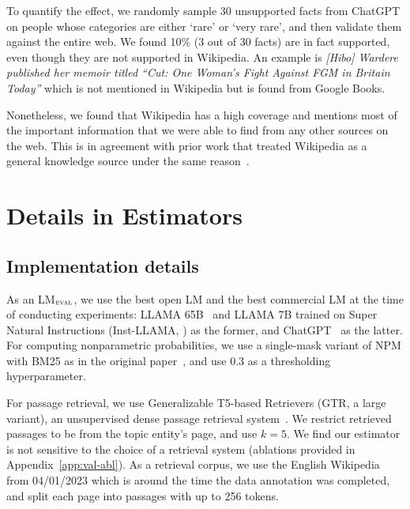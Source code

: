 \documentclass[11pt]{article}
\newcommand{\evalLM}{LM$_\textsc{eval}$}
\newcommand{\kalpesh}[1]{\textcolor{brown}{[Kalpesh: #1]}
}
\newcommand{\hanna}[1]{\textcolor{red}{[Hanna: #1]}
}
\begin{document}
To quantify the effect, we randomly sample 30 unsupported facts from ChatGPT on people whose categories are either `rare' or `very rare', and then validate them against the entire web. We found 10\% (3 out of 30 facts) are in fact supported, even though they are not supported in Wikipedia. An example is \emph{[Hibo] Wardere published her memoir titled ``Cut: One Woman's Fight Against FGM in Britain Today''} which is not mentioned in Wikipedia but is found from Google Books.

Nonetheless, we found that Wikipedia has a high coverage and mentions most of the important information that we were able to find from any other sources on the web. This is in agreement with prior work that treated Wikipedia as a general knowledge source under the same reason~\cite{chen-etal-2017-reading,petroni-etal-2021-kilt}.



\section{Details in Estimators}\label{app:exp-details}

\subsection{Implementation details}\label{subsubsec:setup-validation}

As an \evalLM, we use the best open LM and the best commercial LM at the time of conducting experiments: LLAMA 65B~\citep{touvron2023llama} and LLAMA 7B trained on Super Natural Instructions (Inst-LLAMA, \citealp{wang2022super}) as the former, and ChatGPT~\citep{chatgpt} as the latter. %
For computing nonparametric probabilities, we use a single-mask variant of NPM with BM25 as in the original paper~\citep{min2022nonparametric}, and use $0.3$ as a thresholding hyperparameter.

For passage retrieval, we use Generalizable T5-based Retrievers (GTR, a large variant), an unsupervised dense passage retrieval system~\citep{ni2021large}. We restrict retrieved passages to be from the topic entity's page, and use $k=5$.
We find our estimator is not sensitive to the choice of a retrieval system (ablations provided in Appendix~\ref{app:val-abl}). %
As a retrieval corpus, we use the English Wikipedia from 04/01/2023 which is around the time the data annotation was completed, and split each page into passages with up to 256 tokens.
\end{document}
